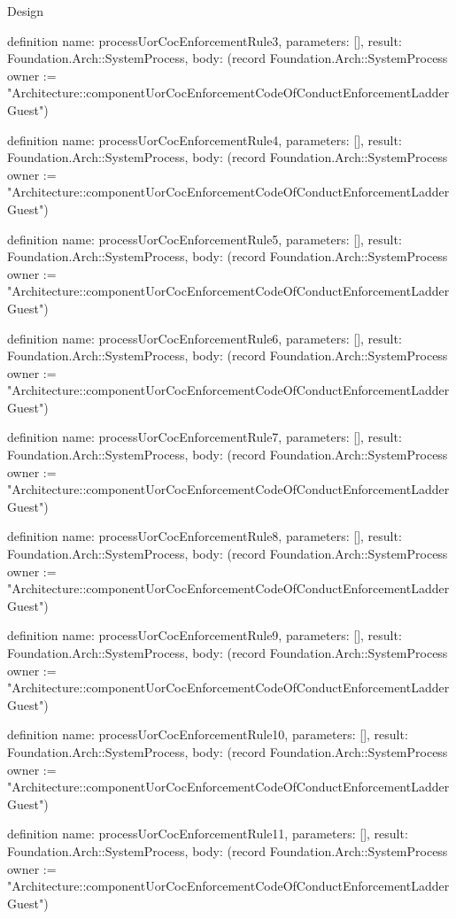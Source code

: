\begin{lexlean}{Design}
\begin{semanticmodule}
definition{
  name: processUorCocEnforcementRule3,
  parameters: [],
  result: Foundation.Arch::SystemProcess,
  body: (record Foundation.Arch::SystemProcess {owner := "Architecture::componentUorCocEnforcementCodeOfConductEnforcementLadderGuest"})
}

definition{
  name: processUorCocEnforcementRule4,
  parameters: [],
  result: Foundation.Arch::SystemProcess,
  body: (record Foundation.Arch::SystemProcess {owner := "Architecture::componentUorCocEnforcementCodeOfConductEnforcementLadderGuest"})
}

definition{
  name: processUorCocEnforcementRule5,
  parameters: [],
  result: Foundation.Arch::SystemProcess,
  body: (record Foundation.Arch::SystemProcess {owner := "Architecture::componentUorCocEnforcementCodeOfConductEnforcementLadderGuest"})
}

definition{
  name: processUorCocEnforcementRule6,
  parameters: [],
  result: Foundation.Arch::SystemProcess,
  body: (record Foundation.Arch::SystemProcess {owner := "Architecture::componentUorCocEnforcementCodeOfConductEnforcementLadderGuest"})
}

definition{
  name: processUorCocEnforcementRule7,
  parameters: [],
  result: Foundation.Arch::SystemProcess,
  body: (record Foundation.Arch::SystemProcess {owner := "Architecture::componentUorCocEnforcementCodeOfConductEnforcementLadderGuest"})
}

definition{
  name: processUorCocEnforcementRule8,
  parameters: [],
  result: Foundation.Arch::SystemProcess,
  body: (record Foundation.Arch::SystemProcess {owner := "Architecture::componentUorCocEnforcementCodeOfConductEnforcementLadderGuest"})
}

definition{
  name: processUorCocEnforcementRule9,
  parameters: [],
  result: Foundation.Arch::SystemProcess,
  body: (record Foundation.Arch::SystemProcess {owner := "Architecture::componentUorCocEnforcementCodeOfConductEnforcementLadderGuest"})
}

definition{
  name: processUorCocEnforcementRule10,
  parameters: [],
  result: Foundation.Arch::SystemProcess,
  body: (record Foundation.Arch::SystemProcess {owner := "Architecture::componentUorCocEnforcementCodeOfConductEnforcementLadderGuest"})
}

definition{
  name: processUorCocEnforcementRule11,
  parameters: [],
  result: Foundation.Arch::SystemProcess,
  body: (record Foundation.Arch::SystemProcess {owner := "Architecture::componentUorCocEnforcementCodeOfConductEnforcementLadderGuest"})
}


\end{semanticmodule}
\end{lexlean}
